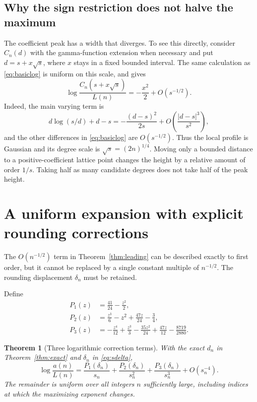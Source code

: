 \documentclass[11pt,letterpaper]{article}
\newtheorem{theorem}{Theorem}[section]
\theoremstyle{remark}
\begin{document}
\subsection{Why the sign restriction does not halve the maximum}

The coefficient peak has a width that diverges. To see this directly,
consider $C_n(d)$ with the gamma-function extension when necessary and put
$d=s+x\sqrt s$, where $x$ stays in a fixed bounded interval. The same
calculation as \eqref{eq:basiclog} is uniform on this scale, and gives
\begin{equation}\label{eq:gaussian}
 \log\frac{C_n(s+x\sqrt s)}{L(n)}
 =-\frac{x^2}{2}+O(s^{-1/2}).
\end{equation}
Indeed, the main varying term is
\[
 d\log(s/d)+d-s=-\frac{(d-s)^2}{2s}
 +O\!\left(\frac{|d-s|^3}{s^2}\right),
\]
and the other differences in \eqref{eq:basiclog} are $O(s^{-1/2})$.
Thus the local profile is Gaussian and its degree scale is
$\sqrt s=(2n)^{1/4}$. Moving only a bounded distance to a positive-coefficient
lattice point changes the height by a relative amount of order $1/s$.
Taking half as many candidate degrees does not take half of the peak height.

\section{A uniform expansion with explicit rounding corrections}\label{sec:expansion}

The $O(n^{-1/2})$ term in Theorem~\ref{thm:leading} can be described exactly
to first order, but it cannot be replaced by a single constant multiple of
$n^{-1/2}$. The rounding displacement $\delta_n$ must be retained.

Define
\begin{align}
 P_1(z)&=\frac{41}{24}-\frac{z^2}{2},\label{eq:p1}\\
 P_2(z)&=\frac{z^3}{6}-z^2+\frac{47z}{24}-\frac34,\label{eq:p2}\\
 P_3(z)&=-\frac{z^4}{12}+\frac{z^3}{3}
         -\frac{35z^2}{24}+\frac{47z}{12}-\frac{8719}{2880}.
         \label{eq:p3}
\end{align}

\begin{theorem}[Three logarithmic correction terms]\label{thm:expansion}
With the exact $d_n$ in Theorem~\ref{thm:exact} and $\delta_n$ in
\eqref{eq:sdelta},
\begin{equation}\label{eq:threelog}
 \boxed{\displaystyle
 \log\frac{a(n)}{L(n)}
 =\frac{P_1(\delta_n)}{s_n}
  +\frac{P_2(\delta_n)}{s_n^2}
  +\frac{P_3(\delta_n)}{s_n^3}
  +O(s_n^{-4}).}
\end{equation}
The remainder is uniform over all integers $n$ sufficiently large, including
indices at which the maximizing exponent changes.
\end{theorem}
\end{document}
